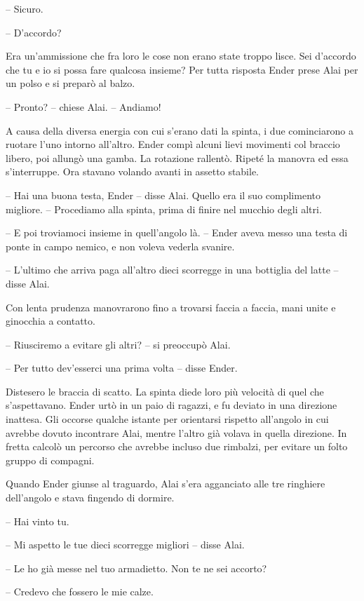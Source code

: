 {-- Sicuro.}

{-- D'accordo?}

{Era un'ammissione che fra loro le cose non erano state troppo lisce.
	Sei d'accordo che tu e io si possa fare qualcosa insieme? Per tutta
	risposta Ender prese Alai per un polso e si preparò al balzo.}

{-- Pronto? -- chiese Alai. -- Andiamo!}

{A causa della diversa energia con cui s'erano dati la spinta, i due
	cominciarono a ruotare l'uno intorno all'altro. Ender compì alcuni lievi
	movimenti col braccio libero, poi allungò una gamba. La rotazione
	rallentò. Ripeté la manovra ed essa s'interruppe. Ora stavano volando
	avanti in assetto stabile.}

{-- Hai una buona testa, Ender -- disse Alai. Quello era il suo
	complimento migliore. -- Procediamo alla spinta, prima di finire nel
	mucchio degli altri.}

{-- E poi troviamoci insieme in quell'angolo là. -- Ender aveva messo
	una testa di ponte in campo nemico, e non voleva vederla svanire.}

{-- L'ultimo che arriva paga all'altro dieci scorregge in una bottiglia
	del latte -- disse Alai.}

{Con lenta prudenza manovrarono fino a trovarsi faccia a faccia, mani
	unite e ginocchia a contatto.}

{-- Riusciremo a evitare gli altri? -- si preoccupò Alai.}

{-- Per tutto dev'esserci una prima volta -- disse Ender.}

{Distesero le braccia di scatto. La spinta diede loro più velocità di
	quel che s'aspettavano. Ender urtò in un paio di ragazzi, e fu deviato
	in una direzione inattesa. Gli occorse qualche istante per orientarsi
	rispetto all'angolo in cui avrebbe dovuto incontrare Alai, mentre
	l'altro già volava in quella direzione. In fretta calcolò un percorso
	che avrebbe incluso due rimbalzi, per evitare un folto gruppo di
	compagni.}

{Quando Ender giunse al traguardo, Alai s'era agganciato alle tre
	ringhiere dell'angolo e stava fingendo di dormire.}

{-- Hai vinto tu.}

{-- Mi aspetto le tue dieci scorregge migliori -- disse Alai.}

{-- Le ho già messe nel tuo armadietto. Non te ne sei accorto?}

{-- Credevo che fossero le mie calze.}

